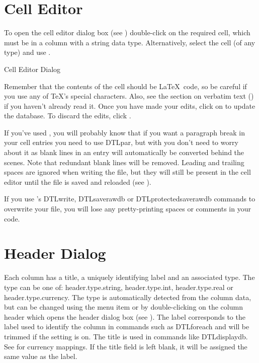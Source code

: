 \section{Cell Editor}\label{sec:celleditor}

To open the cell editor dialog box (see )
double-click on the required cell, which must be in a column with a 
string data type. Alternatively, select the cell (of any type) and use 
.

 {%
 }
 {Cell Editor Dialog}

Remember that the contents of the cell should be \LaTeX\ code, so be
careful if you use any of \TeX's special characters. Also, see the
section on verbatim text () if you haven't 
already read it.
Once you have made your edits, click on 
to update the database. To discard the edits, click 
.

If you've used , you will probably know that 
if you want a paragraph break in your cell entries you need to use 
\gls{DTLpar}, but with  you don't need to worry about it 
as blank lines in an entry will automatically be converted behind 
the scenes. Note that redundant blank lines will be removed. Leading
and trailing spaces are ignored when writing the  file,
but they will still be present in the cell editor until the file is
saved and reloaded (see ).

\begin{important}
If you use 's \gls{DTLwrite},
\gls{DTLsaverawdb} or \gls{DTLprotectedsaverawdb} commands to
overwrite your file, you will lose any pretty-printing spaces or
comments in your code.
\end{important}

\section{Header Dialog}\label{sec:editheader}

Each column has a title, a uniquely identifying label
and an associated type. The type can be one of:
\gls{header.type.string}, 
\gls{header.type.int}, 
\gls{header.type.real} or 
\gls{header.type.currency}.
The type is automatically detected from the column data,
but can be changed using the 
menu item or by double-clicking on the column header which opens the 
header dialog box (see ). The label corresponds 
to the label used to identify the column in commands such
as \gls{DTLforeach} and will be trimmed if the 
 setting is on. The title is used in 
commands like \gls{DTLdisplaydb}. See  for 
currency mappings. If the title field is left blank, it will be assigned 
the same value as the label.

